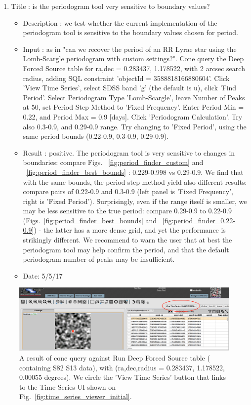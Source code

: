 \documentclass[DM,lsstdraft,toc]{lsstdoc}
\begin{document}
\begin{enumerate}
 \item Title : is the periodogram tool very sensitive to boundary values?
    \begin{itemize}
      \item Description : we test whether the current implementation of the periodogram tool is sensitive to the boundary values chosen for period.
      \item Input : as in "can we recover the period of an RR Lyrae  star using the Lomb-Scargle periodogram with custom settings?". Cone query the Deep Forced Source table for ra,dec = 0.283437\degree, 1.178522\degree, with 2 arcsec search radius, adding SQL constraint 'objectId = 3588818166880604'. Click 'View Time Series', select SDSS band 'g' (the default is u), click 'Find Period'. Select Periodogram Type 'Lomb-Scargle', leave Number of Peaks at 50, set Period Step Method to 'Fixed Frequency'. Enter Period Min = 0.22,  and Period Max = 0.9  [days]. Click 'Periodogram Calculation'. Try also 0.3-0.9, and 0.29-0.9  range. Try changing to 'Fixed Period', using the same period bounds (0.22-0.9,  0.3-0.9, 0.29-0.9).
      \item Result : positive. The periodogram tool is very sensitive to changes in boundaries: compare Figs. ~\ref{fig:period_finder_custom} and ~\ref{fig:period_finder_best_bounds} : 0.229-0.998 vs  0.29-0.9.  We find that with the same bounds, the period step method yield also different results: compare pairs of  0.22-0.9  and 0.3-0.9 (left panel is  'Fixed Frequency', right is 'Fixed Period'). Surprisingly, even if the range itself is smaller, we may be less sensitive to the true period: compare 0.29-0.9 to 0.22-0.9 (Figs.~\ref{fig:period_finder_best_bounds} and ~\ref{fig:period_finder_0.22-0.9}) - the latter has a more dense grid, and yet the performance is strikingly different. We recommend to warn the user that at best the periodogram tool may help confirm the period, and that the default periodogram number of peaks may be insufficient.
      \item Date: 5/5/17
    \end{itemize}

\end{enumerate}



\begin{figure}
\includegraphics[width=\textwidth]{figs/PDAC_cone_result}
\caption{A result of cone query against Run Deep Forced Source table ( containing S82 S13 data), with (ra,dec,radius = 0.283437, 1.178522, 0.00055 degrees). We circle the 'View Time Series' button that links to the Time Series UI  shown on Fig.~\ref{fig:time_series_viewer_initial}. }
\label{fig:time_series_cone_result}
\end{figure}
\end{document}

